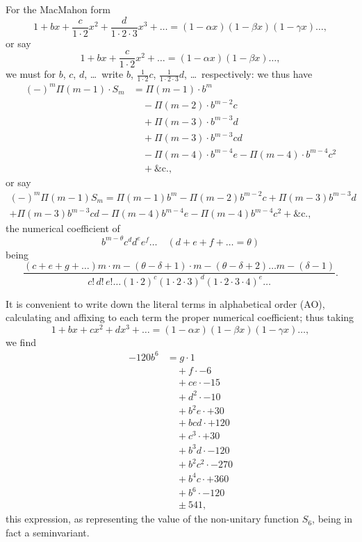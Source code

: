 \documentclass[11pt,a4paper]{book}
\begin{document}
For the MacMahon form
\[
1 + bx + \frac{c}{1 \cdot 2}x^2 + \frac{d}{1 \cdot 2 \cdot 3}x^3 + \ldots = (1 - \alpha x)(1 - \beta x)(1 - \gamma x)\ldots,
\]
or say
\[
1 + bx + \frac{c}{1 \cdot 2}x^2 + \ldots = (1 - \alpha x)(1 - \beta x)\ldots,
\]
we must for $b$, $c$, $d$, \ldots\ write $b$, $\frac{1}{1 \cdot 2}c$, $\frac{1}{1 \cdot 2 \cdot 3}d$, \ldots\ respectively: we thus have
\begin{align*}
(-)^m \Pi(m-1) \cdot S_m &= \Pi(m-1) \cdot b^m\\
&\quad - \Pi(m-2) \cdot b^{m-2}c\\
&\quad + \Pi(m-3) \cdot b^{m-3}d\\
&\quad + \Pi(m-3) \cdot b^{m-3}cd\\
&\quad - \Pi(m-4) \cdot b^{m-4}e - \Pi(m-4) \cdot b^{m-4}c^2\\
&\quad + \&\text{c.},
\end{align*}
or say
\begin{multline*}
(-)^m \Pi(m-1) S_m = \Pi(m-1)b^m - \Pi(m-2)b^{m-2}c + \Pi(m-3)b^{m-3}d\\
+ \Pi(m-3)b^{m-3}cd - \Pi(m-4)b^{m-4}e - \Pi(m-4)b^{m-4}c^2 + \&\text{c.},
\end{multline*}
the numerical coefficient of
\[
b^{m-\theta} c^d d^e e^f \ldots \quad (d + e + f + \ldots = \theta)
\]
being
\[
\frac{(c + e + g + \ldots)m \cdot m - (\theta - \delta + 1) \cdot m - (\theta - \delta + 2) \ldots m - (\delta - 1)}{c!\,d!\,e!\ldots (1 \cdot 2)^c (1 \cdot 2 \cdot 3)^d (1 \cdot 2 \cdot 3 \cdot 4)^e \ldots}.
\]

\newpage
It is convenient to write down the literal terms in alphabetical order (AO),
calculating and affixing to each term the proper numerical coefficient; thus taking
\[
1 + bx + cx^2 + dx^3 + \ldots = (1 - \alpha x)(1 - \beta x)(1 - \gamma x)\ldots,
\]
we find
\begin{align*}
-120b^6 &= g \cdot 1\\
&\quad + f \cdot -6\\
&\quad + ce \cdot -15\\
&\quad + d^2 \cdot -10\\
&\quad + b^2e \cdot +30\\
&\quad + bcd \cdot +120\\
&\quad + c^3 \cdot +30\\
&\quad + b^3d \cdot -120\\
&\quad + b^2c^2 \cdot -270\\
&\quad + b^4c \cdot +360\\
&\quad + b^6 \cdot -120\\
&\quad \pm 541,
\end{align*}
this expression, as representing the value of the non-unitary function $S_6$, being in
fact a seminvariant.
\end{document}
